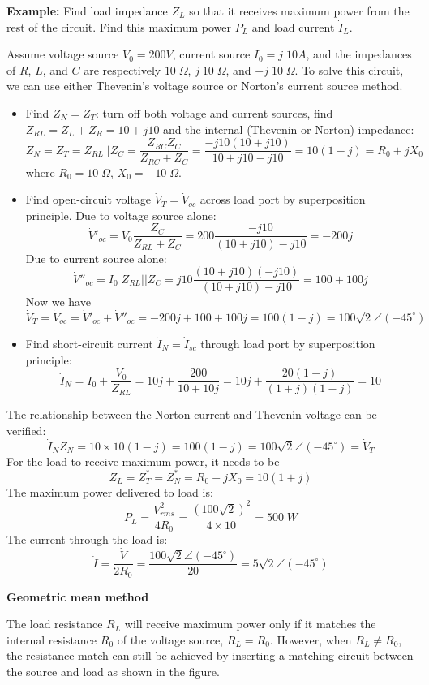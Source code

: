 {\bf Example:}
Find load impedance $Z_L$ so that it receives maximum power from the rest 
of the circuit. Find this maximum power $P_L$ and load current $\dot{I}_L$.


Assume voltage source $V_0=200 V$, current source $I_0=j\;10 A$, and the 
impedances of $R$, $L$, and $C$ are respectively $10\;\Omega$, 
$j\;10\;\Omega$, and $-j\;10\;\Omega$. To solve this circuit, we can use 
either Thevenin's voltage source or Norton's current source method.

\begin{itemize}
\item Find $Z_N=Z_T$: turn off both voltage and current sources, find 
  $Z_{RL}=Z_L+Z_R=10+j10$ and the internal (Thevenin or Norton) impedance:
  \[ 
  Z_N=Z_T=Z_{RL}||Z_C=\frac{Z_{RC}Z_C}{Z_{RC}+Z_C}
  =\frac{-j10(10+j10)}{10+j10-j10}=10(1-j)=R_0+jX_0
  \]
  where $R_0=10\;\Omega$, $X_0=-10\;\Omega$.
\item Find open-circuit voltage $\dot{V}_T=\dot{V}_{oc}$ across load port 
  by superposition principle. Due to voltage source alone:
  \[
  \dot{V}'_{oc}=V_0\frac{Z_C}{Z_{RL}+Z_C}
  =200\frac{-j10}{(10+j10)-j10}=-200j 
  \]
  Due to current source alone:
  \[ 
  \dot{V}''_{oc}=I_0\;Z_{RL}||Z_C
  =j10\frac{(10+j10)(-j10)}{(10+j10)-j10}=100+100j 
  \]
  Now we have
  \[
  \dot{V}_T=\dot{V}_{oc}=\dot{V}'_{oc}+\dot{V}''_{oc}=-200j+100+100j=100(1-j)
  =100\sqrt{2}\angle(-45^\circ) 
  \]
\item Find short-circuit current $\dot{I}_N=\dot{I}_{sc}$ through load port
  by superposition principle:
  \[ 
  \dot{I}_N=I_0+\frac{V_0}{Z_{RL}}
  =10j+\frac{200}{10+10j}=10j+\frac{20(1-j)}{(1+j)(1-j)}=10 
  \]
\end{itemize}
The relationship between the Norton current and Thevenin voltage can be
verified:
\[
\dot{I}_N Z_N=10\times10(1-j)=100(1-j)=100\sqrt{2}\angle(-45^\circ)=\dot{V}_T  
\]
For the load to receive maximum power, it needs to be
\[
Z_L=Z_T^*=Z_N^*=R_0-jX_0=10(1+j) 
\]
The maximum power delivered to load is:
\[
P_L=\frac{V^2_{rms}}{4R_0}=\frac{(100\sqrt{2})^2}{4\times 10}=500\;W 
\]
The current through the load is:
\[ 
\dot{I}=\frac{\dot{V}}{2R_0}=\frac{100\sqrt{2}\angle(-45^\circ)}{20}
=5\sqrt{2}\angle (-45^\circ) 
\]

{\bf Geometric mean method}

The load resistance $R_L$ will receive maximum power only if it matches the 
internal resistance $R_0$ of the voltage source, $R_L=R_0$. However, when
$R_L\ne R_0$, the resistance match can still be achieved by inserting a 
matching circuit between the source and load as shown in the figure. 

